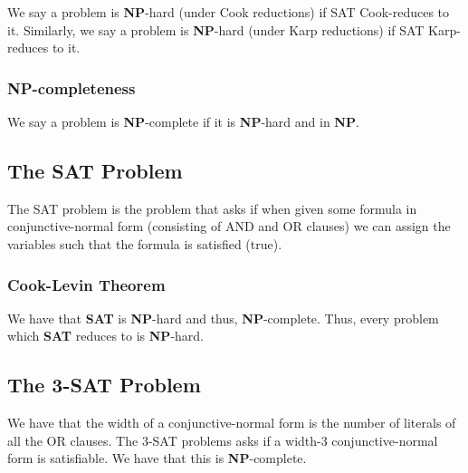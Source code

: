 We say a problem is \textbf{NP}-hard (under Cook reductions) if SAT Cook-reduces to it.
Similarly, we say a problem is \textbf{NP}-hard (under Karp reductions) if SAT Karp-reduces to it.

\subsubsection{\textbf{NP}-completeness}

We say a problem is \textbf{NP}-complete if it is \textbf{NP}-hard and in \textbf{NP}.

\subsection{The SAT Problem}

The SAT problem is the problem that asks if when given some formula in conjunctive-normal form
(consisting of AND and OR clauses) we can assign the variables such that the formula is 
satisfied (true).

\subsubsection{Cook-Levin Theorem}

We have that \textbf{SAT} is \textbf{NP}-hard and thus, \textbf{NP}-complete.
Thus, every problem which \textbf{SAT} reduces to is \textbf{NP}-hard.

\subsection{The 3-SAT Problem}

We have that the width of a conjunctive-normal form is the number of literals
of all the OR clauses. The 3-SAT problems asks if a width-3 conjunctive-normal 
form is satisfiable. We have that this is \textbf{NP}-complete.